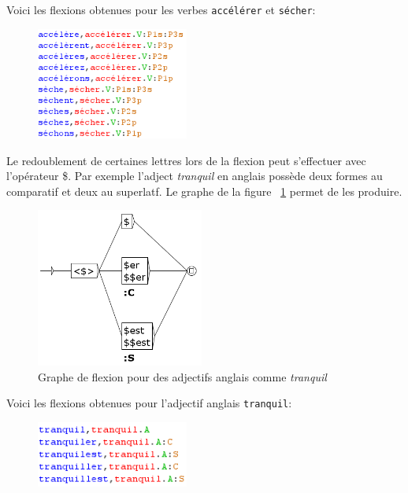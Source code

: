 \newpage
\noindent
Voici les flexions obtenues pour les verbes \verb+accélérer+ et \verb+sécher+:

\begin{figure}[!ht]
\begin{center}
\includegraphics[width=5cm]{resources/img/fig3-flexion_secher.png}
\end{center}
\end{figure}

\bigskip
\noindent
Le redoublement de certaines lettres lors de la flexion peut s'effectuer avec l'opérateur \$.
Par exemple l'adject {\it tranquil} en anglais possède deux formes au comparatif et deux au
superlatf. Le graphe de la figure ~\ref{fig-inflection-tranquil} permet de les produire.

\bigskip
\begin{figure}[!ht]
\begin{center}
\includegraphics[width=5.5cm]{resources/img/fig3-Advanced_operators_with_Variables-A_tranquil.png}
\caption{Graphe de flexion pour des adjectifs anglais comme {\it tranquil}
\label{fig-inflection-tranquil}}
\end{center}
\end{figure}

\noindent Voici les flexions obtenues pour l'adjectif anglais \verb+tranquil+:

\bigskip
\begin{figure}[!ht]
\begin{center}
\includegraphics[width=5cm]{resources/img/fig3-flexion_tranquil.png}
\end{center}
\end{figure}


